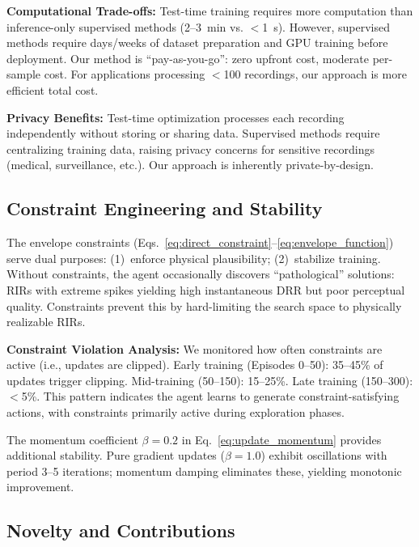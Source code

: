 \documentclass[12pt,a4paper]{article}
\begin{document}
\textbf{Computational Trade-offs:} Test-time training requires more computation than inference-only supervised methods (2--3~min vs. $<$1~s). However, supervised methods require days/weeks of dataset preparation and GPU training before deployment. Our method is ``pay-as-you-go'': zero upfront cost, moderate per-sample cost. For applications processing $<$100 recordings, our approach is more efficient total cost.

\textbf{Privacy Benefits:} Test-time optimization processes each recording independently without storing or sharing data. Supervised methods require centralizing training data, raising privacy concerns for sensitive recordings (medical, surveillance, etc.). Our approach is inherently private-by-design.

\subsection{Constraint Engineering and Stability}

The envelope constraints (Eqs.~\eqref{eq:direct_constraint}--\eqref{eq:envelope_function}) serve dual purposes: (1)~enforce physical plausibility; (2)~stabilize training. Without constraints, the agent occasionally discovers ``pathological'' solutions: RIRs with extreme spikes yielding high instantaneous DRR but poor perceptual quality. Constraints prevent this by hard-limiting the search space to physically realizable RIRs.

\textbf{Constraint Violation Analysis:} We monitored how often constraints are active (i.e., updates are clipped). Early training (Episodes 0--50): 35--45\% of updates trigger clipping. Mid-training (50--150): 15--25\%. Late training (150--300): $<$5\%. This pattern indicates the agent learns to generate constraint-satisfying actions, with constraints primarily active during exploration phases.

The momentum coefficient $\beta=0.2$ in Eq.~\eqref{eq:update_momentum} provides additional stability. Pure gradient updates ($\beta=1.0$) exhibit oscillations with period 3--5 iterations; momentum damping eliminates these, yielding monotonic improvement.

\subsection{Novelty and Contributions}
\end{document}
